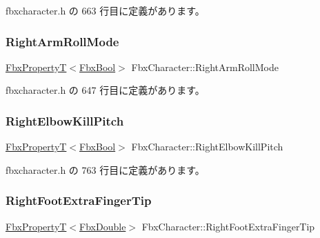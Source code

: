  fbxcharacter.\+h の 663 行目に定義があります。

\mbox{\label{class_fbx_character_a3b0444d10aa3a7e90c07b7f0eba087d8}} 
\subsubsection{\texorpdfstring{Right\+Arm\+Roll\+Mode}{RightArmRollMode}}
{\footnotesize\ttfamily \hyperlink{class_fbx_property_t}{Fbx\+PropertyT}$<$\hyperlink{fbxtypes_8h_a92e0562b2fe33e76a242f498b362262e}{Fbx\+Bool}$>$ Fbx\+Character\+::\+Right\+Arm\+Roll\+Mode}



 fbxcharacter.\+h の 647 行目に定義があります。

\mbox{\label{class_fbx_character_af81b691ddd65a26b867160ab3a8d57c2}} 
\subsubsection{\texorpdfstring{Right\+Elbow\+Kill\+Pitch}{RightElbowKillPitch}}
{\footnotesize\ttfamily \hyperlink{class_fbx_property_t}{Fbx\+PropertyT}$<$\hyperlink{fbxtypes_8h_a92e0562b2fe33e76a242f498b362262e}{Fbx\+Bool}$>$ Fbx\+Character\+::\+Right\+Elbow\+Kill\+Pitch}



 fbxcharacter.\+h の 763 行目に定義があります。

\mbox{\label{class_fbx_character_a8f4fb6c7e53220e3ab256c5055742067}} 
\subsubsection{\texorpdfstring{Right\+Foot\+Extra\+Finger\+Tip}{RightFootExtraFingerTip}}
{\footnotesize\ttfamily \hyperlink{class_fbx_property_t}{Fbx\+PropertyT}$<$\hyperlink{fbxtypes_8h_a171e72a1c46fc15c1a6c9c31948c1c5b}{Fbx\+Double}$>$ Fbx\+Character\+::\+Right\+Foot\+Extra\+Finger\+Tip}



